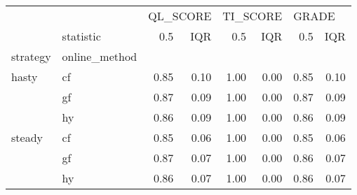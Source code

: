 \begin{tabular}{llrrrrrr}
\toprule
       & {} & \multicolumn{2}{l}{QL\_SCORE} & \multicolumn{2}{l}{TI\_SCORE} & \multicolumn{2}{l}{GRADE} \\
       & statistic &      0.5 &  IQR &      0.5 &  IQR &   0.5 &  IQR \\
strategy & online\_method &          &      &          &      &       &      \\
\midrule
hasty & cf &     0.85 & 0.10 &     1.00 & 0.00 &  0.85 & 0.10 \\
       & gf &     0.87 & 0.09 &     1.00 & 0.00 &  0.87 & 0.09 \\
       & hy &     0.86 & 0.09 &     1.00 & 0.00 &  0.86 & 0.09 \\
steady & cf &     0.85 & 0.06 &     1.00 & 0.00 &  0.85 & 0.06 \\
       & gf &     0.87 & 0.07 &     1.00 & 0.00 &  0.86 & 0.07 \\
       & hy &     0.86 & 0.07 &     1.00 & 0.00 &  0.86 & 0.07 \\
\bottomrule
\end{tabular}
